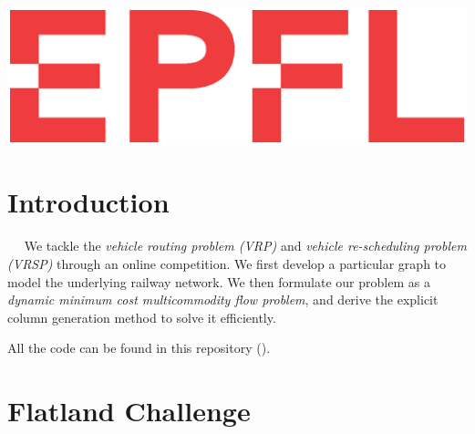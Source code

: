 \documentclass[14pt,a4paper]{article}
\theoremstyle{definition}
\numberwithin{equation}{subsection}
\begin{document}
\begin{titlepage}
\centering
 \includegraphics[width=0.5\linewidth]{img/logo.eps}\\ %

 
 

\vfill %


\end{titlepage}




\newpage
\pagestyle{fancy}
\fancyhead[L]{}




\tableofcontents
{}

\newpage








\section*{Introduction}
\label{sec:intro}

$\quad$ We tackle the \emph{vehicle routing problem (VRP)} and \emph{vehicle re-scheduling problem (VRSP)} through an online competition. We first develop a particular graph to model the underlying railway network. We then formulate our problem as a \emph{dynamic minimum cost multicommodity flow problem}, and derive the explicit column generation method to solve it efficiently.

All the code can be found in this repository (\cite{GIT}).





\section{Flatland Challenge}
\todo[inline]{\blindtext \\ \blindtext}
\end{document}
